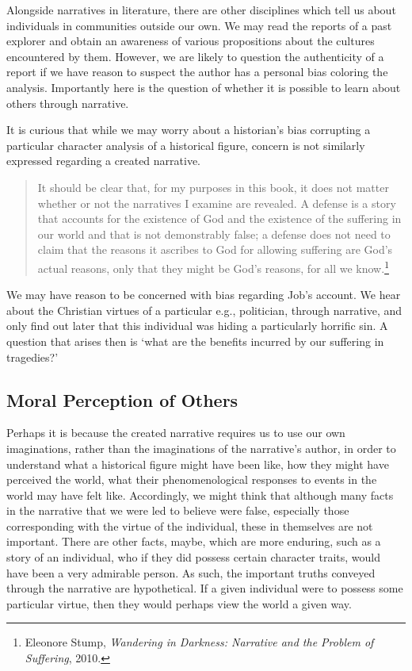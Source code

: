 \documentclass[
  12pt,
]{book}
\theoremstyle{definition}
\theoremstyle{definition}
\theoremstyle{definition}
\theoremstyle{definition}
\theoremstyle{remark}
\begin{document}
Alongside narratives in literature, there are other disciplines which tell us about individuals in communities outside our own. We may read the reports of a past explorer and obtain an awareness of various propositions about the cultures encountered by them. However, we are likely to question the authenticity of a report if we have reason to suspect the author has a personal bias coloring the analysis. Importantly here is the question of whether it is possible to learn about others through narrative.

It is curious that while we may worry about a historian's bias corrupting a particular character analysis of a historical figure, concern is not similarly expressed regarding a created narrative.

\begin{quote}
It should be clear that, for my purposes in this book, it does not matter whether or not the narratives I examine are revealed. A defense is a story that accounts for the existence of God and the existence of the suffering in our world and that is not demonstrably false; a defense does not need to claim that the reasons it ascribes to God for allowing suffering are God's actual reasons, only that they might be God's reasons, for all we know.\footnote{Eleonore Stump, \emph{Wandering in {Darkness}: {Narrative} and the {Problem} of {Suffering}}, 2010.}
\end{quote}

We may have reason to be concerned with bias regarding Job's account. We hear about the Christian virtues of a particular e.g., politician, through narrative, and only find out later that this individual was hiding a particularly horrific sin. A question that arises then is `what are the benefits incurred by our suffering in tragedies?'

\subsection*{Moral Perception of Others}\label{moral-perception-of-others}

Perhaps it is because the created narrative requires us to use our own imaginations, rather than the imaginations of the narrative's author, in order to understand what a historical figure might have been like, how they might have perceived the world, what their phenomenological responses to events in the world may have felt like. Accordingly, we might think that although many facts in the narrative that we were led to believe were false, especially those corresponding with the virtue of the individual, these in themselves are not important. There are other facts, maybe, which are more enduring, such as a story of an individual, who if they did possess certain character traits, would have been a very admirable person. As such, the important truths conveyed through the narrative are hypothetical. If a given individual were to possess some particular virtue, then they would perhaps view the world a given way.
\end{document}
